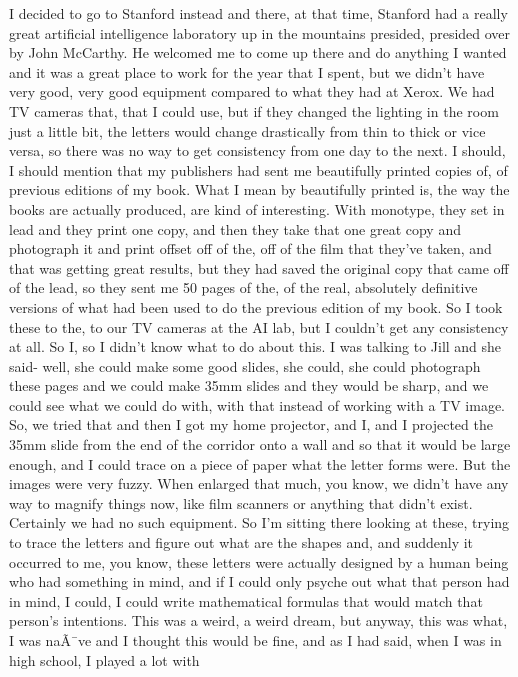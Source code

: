 \documentclass[]{article}
\begin{document}
I decided to go to Stanford instead and there, at that time, Stanford
had a really great artificial intelligence laboratory up in the
mountains presided, presided over by John McCarthy. He welcomed me to
come up there and do anything I wanted and it was a great place to work
for the year that I spent, but we didn't have very good, very good
equipment compared to what they had at Xerox. We had TV cameras that,
that I could use, but if they changed the lighting in the room just a
little bit, the letters would change drastically from thin to thick or
vice versa, so there was no way to get consistency from one day to the
next. I should, I should mention that my publishers had sent me
beautifully printed copies of, of previous editions of my book. What I
mean by beautifully printed is, the way the books are actually produced,
are kind of interesting. With monotype, they set in lead and they print
one copy, and then they take that one great copy and photograph it and
print offset off of the, off of the film that they've taken, and that
was getting great results, but they had saved the original copy that
came off of the lead, so they sent me 50 pages of the, of the real,
absolutely definitive versions of what had been used to do the previous
edition of my book. So I took these to the, to our TV cameras at the AI
lab, but I couldn't get any consistency at all. So I, so I didn't know
what to do about this. I was talking to Jill and she said- well, she
could make some good slides, she could, she could photograph these pages
and we could make 35mm slides and they would be sharp, and we could see
what we could do with, with that instead of working with a TV image. So,
we tried that and then I got my home projector, and I, and I projected
the 35mm slide from the end of the corridor onto a wall and so that it
would be large enough, and I could trace on a piece of paper what the
letter forms were. But the images were very fuzzy. When enlarged that
much, you know, we didn't have any way to magnify things now, like film
scanners or anything that didn't exist. Certainly we had no such
equipment. So I'm sitting there looking at these, trying to trace the
letters and figure out what are the shapes and, and suddenly it occurred
to me, you know, these letters were actually designed by a human being
who had something in mind, and if I could only psyche out what that
person had in mind, I could, I could write mathematical formulas that
would match that person's intentions. This was a weird, a weird dream,
but anyway, this was what, I was naÃ¯ve and I thought this would be
fine, and as I had said, when I was in high school, I played a lot with
\end{document}
